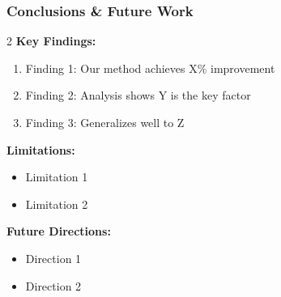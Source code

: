 \documentclass[final]{beamer}
\begin{document}
\begin{frame}[t]
\frametitle{Conclusions \& Future Work}
\begin{multicols}{2}
\textbf{Key Findings:}
\begin{enumerate}
    \item Finding 1: Our method achieves X\% improvement
    \item Finding 2: Analysis shows Y is the key factor
    \item Finding 3: Generalizes well to Z
\end{enumerate}

\columnbreak

\textbf{Limitations:}
\begin{itemize}
    \item Limitation 1
    \item Limitation 2
\end{itemize}

\textbf{Future Directions:}
\begin{itemize}
    \item Direction 1
    \item Direction 2
\end{itemize}
\end{multicols}
\end{frame}
\end{document}
